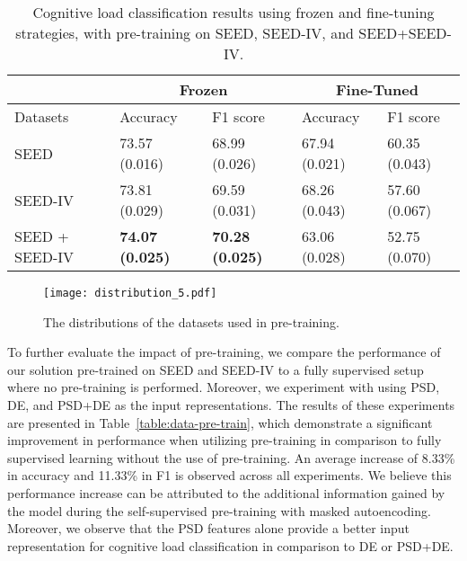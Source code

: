 \documentclass[sigconf]{acmart}
\begin{document}
  \begin{table}[t]
        \caption{Cognitive load classification results using frozen and fine-tuning strategies, with pre-training on SEED, SEED-IV, and SEED+SEED-IV.}
        \label{table:Frozen}
        \small
    \setlength
    \tabcolsep{2pt}
        \begin{center}{
            \begin{tabular}{l|ll|ll}
                 \hline
            \multicolumn{1}{c|}{} & \multicolumn{2}{|c}{Frozen}& \multicolumn{2}{|c}{Fine-Tuned}\\
                 \hline
                 Datasets & Accuracy & F1 score &  Accuracy & F1 score\\
                 \hline\hline
                 SEED & 73.57 (0.016) & 68.99 (0.026) & 67.94 (0.021) & 60.35 (0.043) \\
                 SEED-IV & 73.81 (0.029) & 69.59 (0.031) & 68.26 (0.043) & 57.60 (0.067)  \\
                 SEED + SEED-IV & \textbf{74.07 (0.025)} & \textbf{70.28 (0.025)} & 63.06 (0.028) & 52.75 (0.070)  \\
                 \hline
                \end{tabular} 
                }
        \end{center}
\end{table}


\begin{figure}[t]
\centering
\texttt{[image: distribution\_5.pdf]}
\caption{The distributions of the datasets used in pre-training.}
  \vspace{8mm}
\label{figDIST}
\end{figure}

To further evaluate the impact of pre-training, we compare the performance of our solution pre-trained on SEED and SEED-IV to a fully supervised setup where no pre-training is performed. Moreover, we experiment with using PSD, DE, and PSD+DE as the input representations. The results of these experiments are presented in Table~\ref{table:data-pre-train}, which demonstrate a significant improvement in performance when utilizing pre-training in comparison to fully supervised learning without the use of pre-training. An average increase of 8.33\% in accuracy and 11.33\% in F1 is observed across all experiments. We believe this performance increase can be attributed to the additional information gained by the model during the self-supervised pre-training with masked autoencoding. Moreover, we observe that the PSD features alone provide a better input representation for cognitive load classification in comparison to DE or PSD+DE.
\end{document}

